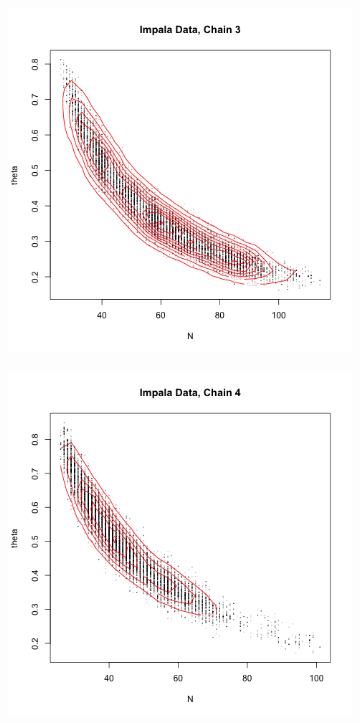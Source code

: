 \documentclass[10pt,psamsfonts]{amsart}
\theoremstyle{definition}
\theoremstyle{remark}
\numberwithin{equation}{section}
\begin{document}
\begin{figure}
\begin{subfigure}[b]{0.3\textwidth}
	\end{subfigure}
	\begin{subfigure}[b]{0.3\textwidth}
		\includegraphics[width=\textwidth]{wonlee_mcmc_impala_3.png}
	\end{subfigure}
	\begin{subfigure}[b]{0.3\textwidth}
		\includegraphics[width=\textwidth]{wonlee_mcmc_impala_4.png}

\end{subfigure}
\end{figure}
\end{document}
